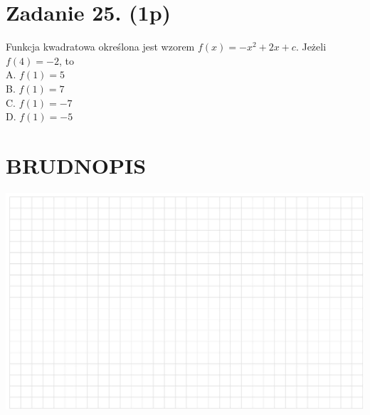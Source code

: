 \documentclass[10pt]{article}
\begin{document}
\section*{Zadanie 25. (1p)}
Funkcja kwadratowa określona jest wzorem \(f(x)=-x^{2}+2 x+c\). Jeżeli \(f(4)=-2\), to\\
A. \(f(1)=5\)\\
B. \(f(1)=7\)\\
C. \(f(1)=-7\)\\
D. \(f(1)=-5\)

\section*{BRUDNOPIS}
\begin{center}
\includegraphics[max width=\textwidth]{2024_11_21_cce9c7ad32a1dbcd58dag-07(2)}
\end{center}
\end{document}
